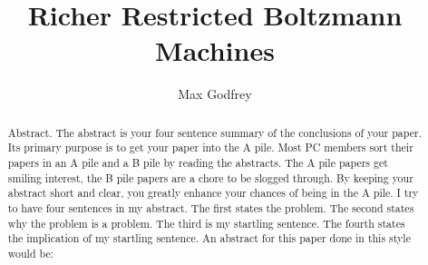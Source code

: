 \documentclass[11pt, a4paper, twoside, openright
              ]{report}
\title{Richer Restricted Boltzmann Machines}
\author{Max Godfrey}
\date{}
\begin{document}
\frontmatter



\begin{abstract}
Abstract. The abstract is your four sentence summary of the conclusions of your paper. Its primary purpose is to get your paper into the A pile. Most PC members sort their papers in an A pile and a B pile by reading the abstracts. The A pile papers get smiling interest, the B pile papers are a chore to be slogged through. By keeping your abstract short and clear, you greatly enhance your chances of being in the A pile. I try to have four sentences in my abstract. The first states the problem. The second states why the problem is a problem. The third is my startling sentence. The fourth states the implication of my startling sentence. An abstract for this paper done in this style would be:

\end{abstract}


\maketitle



\tableofcontents



\mainmatter%







% 

\backmatter%




\end{document}
